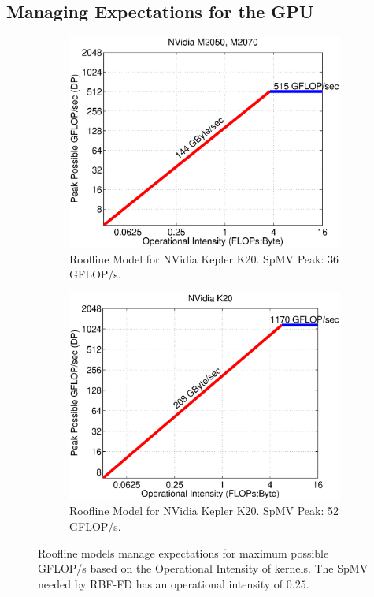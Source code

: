 \documentclass{report}
\begin{document}
\subsection{Managing Expectations for the GPU}
\begin{figure} 
\begin{subfigure}{0.5\textwidth}
\centering
\includegraphics[width=\textwidth]{../figures/spmv/roofline_m2050_m2070.eps}
\caption{Roofline Model for NVidia Kepler K20. SpMV Peak: 36 GFLOP/s.}
\label{fig:roofline_k20}
\end{subfigure}
\begin{subfigure}{0.5\textwidth}
\centering
\includegraphics[width=\textwidth]{../figures/spmv/roofline_k20.eps}
\caption{Roofline Model for NVidia Kepler K20. SpMV Peak: 52 GFLOP/s.}
\label{fig:roofline_k20}
\end{subfigure}
\caption{Roofline models manage expectations for maximum possible GFLOP/s based on the Operational Intensity of kernels. The SpMV needed by RBF-FD has an operational intensity of $0.25$. }
\end{figure}
\end{document}
